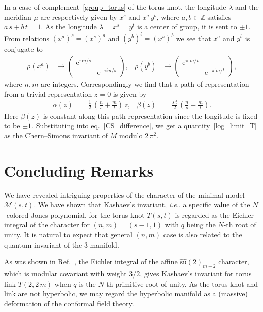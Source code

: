 \documentclass[12pt,reqno]{amsart}
\begin{document}
In a case of complement~\eqref{group_torus} of  the torus knot,
the longitude $\lambda$ and the meridian $\mu$   are respectively given by
$x^s$ and $x^a \, y^b$, where
$a, b \in \mathbb{Z}$
satisfies
$a \, s + b \,t =1$.
As the longitude
$\lambda=x^s=y^t$ is a center of group, it is sent to $\pm 1$.
{}From relations
$ (x^a)^s = (x^s)^a$ and $(y^b)^t = (x^s)^b$
we see that $x^a$ and $y^b$ is conjugate to
\begin{align*}
  \rho(x^a)
  & \to 
  \begin{pmatrix}
    \mathrm{e}^{\pi \mathrm{i} n/s} &
    \\
    & \mathrm{e}^{- \pi \mathrm{i} n/s} 
  \end{pmatrix}  ,
%
  &
%
  \rho(y^b)
  & \to 
  \begin{pmatrix}
    \mathrm{e}^{\pi \mathrm{i} m/t} &
    \\
    & \mathrm{e}^{- \pi \mathrm{i} m/t} 
  \end{pmatrix}  ,
\end{align*}
where $n, m$ are integers.
Correspondingly we find that  a path of representation from a trivial
representation $z=0$ is given by
\begin{align*}
  \alpha(z)
  & =
  \frac{1}{2} \,
  \left(
    \frac{n}{s} + \frac{m}{t}
  \right)  \, z ,
  &
%
  \beta(z)
  & =
  \frac{s \, t}{2} \,
  \left(
    \frac{n}{s} + \frac{m}{t}
  \right)  .
\end{align*}
Here $\beta(z)$ is constant along this path representation since the
longitude is fixed to be $\pm 1$.
Substituting into eq.~\eqref{CS_difference}, we get
a quantity~\eqref{log_limit_T} as the Chern--Simons invariant of $M$ modulo
$2 \, \pi^2$.



\section{Concluding Remarks}

We have revealed intriguing  properties of the character of the minimal model
$\mathcal{M}(s,t)$.
We have shown that
Kashaev's invariant, \emph{i.e.}, a specific value of  the $N$-colored
Jones polynomial,
for the torus knot
$T(s,t)$ is regarded as the Eichler integral of the character for
$(n,m)=(s-1,1)$ with $q$ being the $N$-th root of unity.
It is natural to expect that general $(n,m)$ case is also related to
the quantum invariant of the 3-manifold.

As was shown in Ref.~, the Eichler integral of the
affine $\widehat{\mathrm{su}}(2)_{m+2}$ character,
which is modular covariant with weight $3/2$,
gives  Kashaev's
invariant for
torus link $T(2, 2\, m)$ when $q$ is the $N$-th primitive root of unity.
As the torus knot and link are not hyperbolic,
we may regard
the hyperbolic manifold
as a (massive) deformation  of  the
conformal field
theory.
\end{document}
